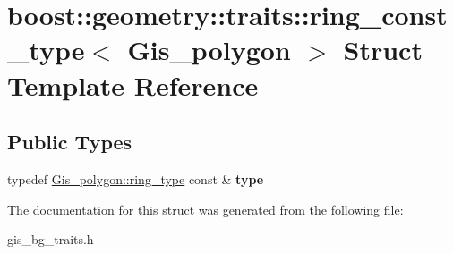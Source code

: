 \hypertarget{structboost_1_1geometry_1_1traits_1_1ring__const__type_3_01Gis__polygon_01_4}{}\section{boost\+:\+:geometry\+:\+:traits\+:\+:ring\+\_\+const\+\_\+type$<$ Gis\+\_\+polygon $>$ Struct Template Reference}
\label{structboost_1_1geometry_1_1traits_1_1ring__const__type_3_01Gis__polygon_01_4}
\subsection*{Public Types}
\begin{DoxyCompactItemize}
\item 
\mbox{\label{structboost_1_1geometry_1_1traits_1_1ring__const__type_3_01Gis__polygon_01_4_a0b3e232f89abc521d0d66a69c3650401}} 
typedef \mbox{\hyperlink{classGis__polygon__ring}{Gis\+\_\+polygon\+::ring\+\_\+type}} const  \& {\bfseries type}
\end{DoxyCompactItemize}


The documentation for this struct was generated from the following file\+:\begin{DoxyCompactItemize}
\item 
gis\+\_\+bg\+\_\+traits.\+h\end{DoxyCompactItemize}
